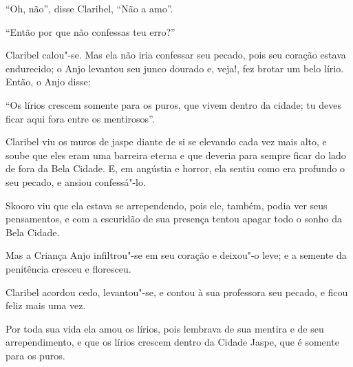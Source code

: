 ``Oh, não'', disse Claribel, ``Não a amo''.

``Então por que não confessas teu erro?''

Claribel calou"-se. Mas ela não iria confessar seu pecado, pois seu
coração estava endurecido; o Anjo levantou seu junco dourado e, veja!,
fez brotar um belo lírio. Então, o Anjo disse:

``Os lírios crescem somente para os puros, que vivem dentro da cidade;
tu deves ficar aqui fora entre os mentirosos''.

Claribel viu os muros de jaspe diante de si se elevando cada vez mais
alto, e soube que eles eram uma barreira eterna e que deveria para
sempre ficar do lado de fora da Bela Cidade. E, em angústia e horror,
ela sentiu como era profundo o seu pecado, e ansiou confessá"-lo.

Skooro viu que ela estava se arrependendo, pois ele, também, podia ver
seus pensamentos, e com a escuridão de sua presença tentou apagar todo o
sonho da Bela Cidade.

Mas a Criança Anjo infiltrou"-se em seu coração e deixou"-o leve; e a
semente da penitência cresceu e floresceu.

Claribel acordou cedo, levantou"-se, e contou à sua professora seu
pecado, e ficou feliz mais uma vez.

Por toda sua vida ela amou os lírios, pois lembrava de sua mentira e de
seu arrependimento, e que os lírios crescem dentro da Cidade Jaspe, que
é somente para os puros.
